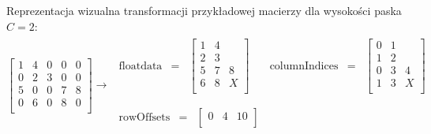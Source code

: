 \begin{itemize}
    Reprezentacja wizualna transformacji przykładowej macierzy dla wysokości paska $C = 2$:
    \[
\left[
\begin{array}{ccccc}
    1 & 4 & 0 & 0 & 0\\ 
    0 & 2 & 3 & 0 & 0\\ 
    5 & 0 & 0 & 7 & 8\\ 
    0 & 6 & 0 & 8 & 0\\ 
\end{array}
\right]
\rightarrow
\begin{matrix}
\begin{matrix}
\text{floatdata} & = & \begin{bmatrix}
1 & 4 &   \\
2 & 3 &   \\
\hline
5 & 7 & 8 \\
6 & 8 & X \\
\end{bmatrix} \\
\end{matrix}
\quad
\begin{matrix}
\text{columnIndices} & = & \begin{bmatrix}
0 & 1 &   \\
1 & 2 &   \\
\hline
0 & 3 & 4 \\
1 & 3 & X \\
\end{bmatrix} \\
\end{matrix}

\\
\begin{matrix}
\text{rowOffsets} & = & \begin{bmatrix}
0 & 4 & 10 \\
\end{bmatrix} \\
\end{matrix}
\end{matrix}
\]
    

\end{itemize}
